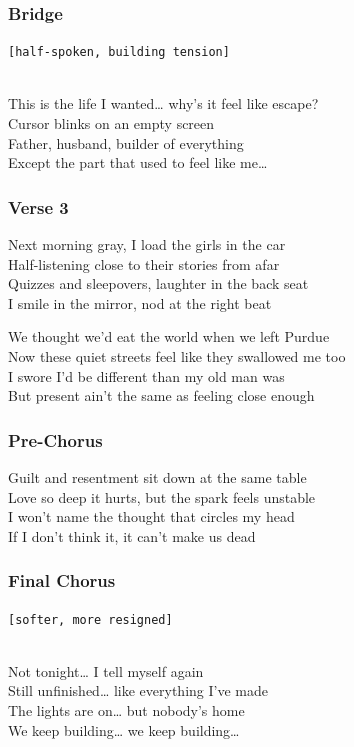 \subsubsection{Bridge}\label{bridge-26}

\texttt{{[}half-spoken,\ building\ tension{]}}\strut \\
This is the life I wanted\ldots{} why's it feel like escape?\\
Cursor blinks on an empty screen\\
Father, husband, builder of everything\\
Except the part that used to feel like me\ldots{}

\subsubsection{Verse 3}\label{verse-3-18}

Next morning gray, I load the girls in the car\\
Half-listening close to their stories from afar\\
Quizzes and sleepovers, laughter in the back seat\\
I smile in the mirror, nod at the right beat

We thought we'd eat the world when we left Purdue\\
Now these quiet streets feel like they swallowed me too\\
I swore I'd be different than my old man was\\
But present ain't the same as feeling close enough

\subsubsection{Pre-Chorus}\label{pre-chorus-65}

Guilt and resentment sit down at the same table\\
Love so deep it hurts, but the spark feels unstable\\
I won't name the thought that circles my head\\
If I don't think it, it can't make us dead

\subsubsection{Final Chorus}\label{final-chorus-3}

\texttt{{[}softer,\ more\ resigned{]}}\strut \\
Not tonight\ldots{} I tell myself again\\
Still unfinished\ldots{} like everything I've made\\
The lights are on\ldots{} but nobody's home\\
We keep building\ldots{} we keep building\ldots{}

